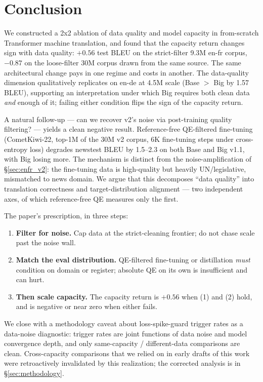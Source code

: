 \section{Conclusion}
\label{sec:conclusion}

We constructed a 2x2 ablation of data quality and model capacity in from-scratch Transformer machine translation, and found that the capacity return changes sign with data quality: $+0.56$ test BLEU on the strict-filter 9.3M en-fr corpus, $-0.87$ on the loose-filter 30M corpus drawn from the same source. The same architectural change pays in one regime and costs in another. The data-quality dimension qualitatively replicates on en-de at 4.5M scale (Base $>$ Big by 1.57 BLEU), supporting an interpretation under which Big requires both clean data \emph{and} enough of it; failing either condition flips the sign of the capacity return.

A natural follow-up --- can we recover v2's noise via post-training quality filtering? --- yields a clean negative result. Reference-free QE-filtered fine-tuning (CometKiwi-22, top-1M of the 30M v2 corpus, 6K fine-tuning steps under cross-entropy loss) degrades newstest BLEU by 1.5--2.3 on both Base and Big v1.1, with Big losing more. The mechanism is distinct from the noise-amplification of \S\ref{sec:enfr_v2}: the fine-tuning data is high-quality but heavily UN/legislative, mismatched to news domain. We argue that this decomposes ``data quality'' into translation correctness and target-distribution alignment --- two independent axes, of which reference-free QE measures only the first.

The paper's prescription, in three steps:
\begin{enumerate}
\item \textbf{Filter for noise.} Cap data at the strict-cleaning frontier; do not chase scale past the noise wall.
\item \textbf{Match the eval distribution.} QE-filtered fine-tuning or distillation \emph{must} condition on domain or register; absolute QE on its own is insufficient and can hurt.
\item \textbf{Then scale capacity.} The capacity return is $+0.56$ when (1) and (2) hold, and is negative or near zero when either fails.
\end{enumerate}

We close with a methodology caveat about loss-spike-guard trigger rates as a data-noise diagnostic: trigger rates are joint functions of data noise and model convergence depth, and only same-capacity / different-data comparisons are clean. Cross-capacity comparisons that we relied on in early drafts of this work were retroactively invalidated by this realization; the corrected analysis is in \S\ref{sec:methodology}.

